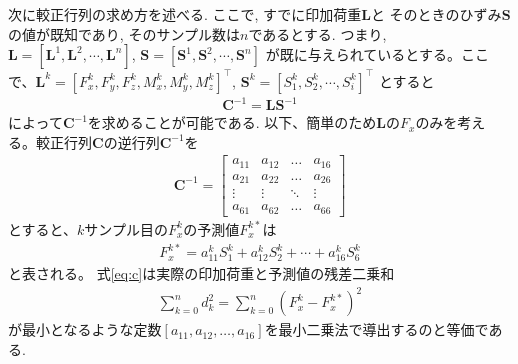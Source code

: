 次に較正行列の求め方\cite{hanyu2010simplified}を述べる. ここで, すでに印加荷重$\bm{L}$と
そのときのひずみ$\bm{S}$の値が既知であり, そのサンプル数は$n$であるとする.
つまり, $\bm{L} = [\bm{L}^1, \bm{L}^2, \cdots , \bm{L}^n]$, $\bm{S} = [\bm{S}^1, \bm{S}^2, \cdots , \bm{S}^n]$
が既に与えられているとする。ここで、$\bm{L}^k = [F^k_x, F^k_y, F^k_z, M^k_x, M^k_y, M^k_z]^{\top}$, $\bm{S}^k = [S^k_1, S^k_2, \cdots, S^k_i]^{\top} $
とすると
\begin{eqnarray}
  \bm{C}^{-1} = \bm{L} \bm{S}^{-1} \label{eq:c}
\end{eqnarray}
によって$\bm{C}^{-1}$を求めることが可能である. 
以下、簡単のため$\bm{L}$の$F_x$のみを考える。較正行列$\bm{C}$の逆行列$\bm{C}^{-1}$を
\begin{eqnarray}
\bm{C}^{-1} = \left[
   \begin{array}{cccc}
     a_{11} & a_{12} & \ldots & a_{16} \\
     a_{21} & a_{22} & \ldots & a_{26} \\
     \vdots & \vdots & \ddots & \vdots \\
     a_{61} & a_{62} & \ldots & a_{66}
   \end{array}
 \right]
\end{eqnarray}
とすると、$k$サンプル目の$F^k_x$の予測値$F^{k\ast}_x$は
\begin{eqnarray}
   F^{k\ast}_x = a^k_{11} S^k_1 + a^k_{12} S^k_2 + \cdots + a^k_{16} S^k_6
\end{eqnarray}
と表される。
式\eqref{eq:c}は実際の印加荷重と予測値の残差二乗和
\begin{eqnarray}
  \sum_{k=0}^{n} d^2_k = \sum_{k=0}^{n} {\left(F^k_x - F^{k\ast}_x \right)}^2
\end{eqnarray}
が最小となるような定数$[a_{11}, a_{12}, \ldots, a_{16}]$を最小二乗法で導出するのと等価である. 
